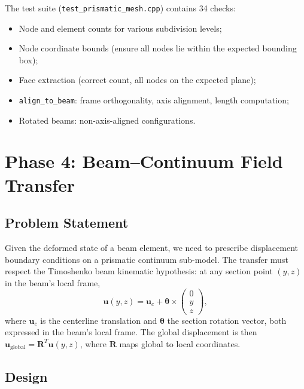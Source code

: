The test suite (\texttt{test\_prismatic\_mesh.cpp}) contains 34 checks:
\begin{itemize}
  \item Node and element counts for various subdivision levels;
  \item Node coordinate bounds (ensure all nodes lie within the expected
        bounding box);
  \item Face extraction (correct count, all nodes on the expected plane);
  \item \texttt{align\_to\_beam}: frame orthogonality, axis alignment,
        length computation;
  \item Rotated beams: non-axis-aligned configurations.
\end{itemize}


\section{Phase 4: Beam--Continuum Field Transfer}
\label{sec:phase4_field_transfer}

\subsection{Problem Statement}

Given the deformed state of a beam element, we need to prescribe
displacement boundary conditions on a prismatic continuum sub-model.
The transfer must respect the Timoshenko beam kinematic hypothesis:
at any section point $(y, z)$ in the beam's local frame,
\begin{equation}
  \label{eq:timoshenko_kinematics}
  \mathbf{u}(y,z) = \mathbf{u}_c + \boldsymbol{\theta} \times
  \begin{pmatrix} 0 \\ y \\ z \end{pmatrix},
\end{equation}
where $\mathbf{u}_c$ is the centerline translation and
$\boldsymbol{\theta}$ the section rotation vector, both expressed in the
beam's local frame.  The global displacement is then
$\mathbf{u}_{\text{global}} = \mathbf{R}^T \mathbf{u}(y,z)$, where
$\mathbf{R}$ maps global to local coordinates.

\subsection{Design}

